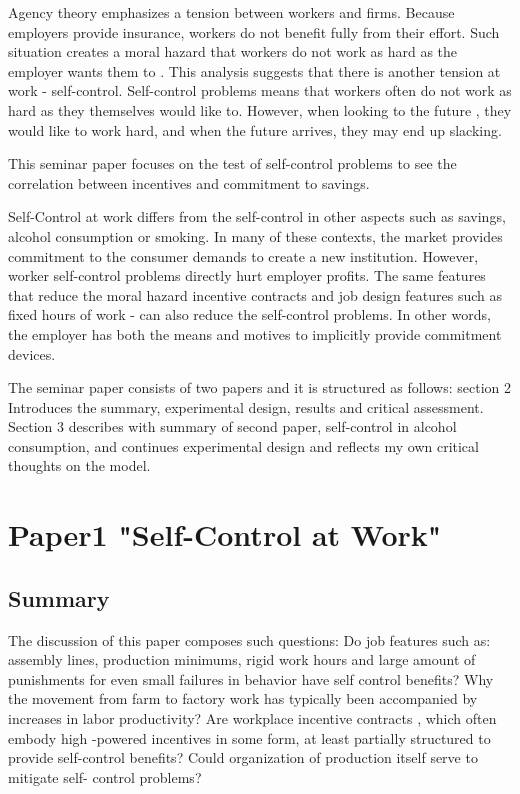 \documentclass[a4paper,12pt]{article}
\begin{document}
Agency theory emphasizes a tension between workers and firms. Because employers provide insurance, workers do not benefit fully from their effort. Such situation creates a moral hazard that workers do not work as hard as the employer wants them to \cite{Holm79}. This analysis suggests that there is another tension at work -  self-control. Self-control problems means that workers often do not work as hard as they themselves would like to. However, when looking to the future , they would like to work hard, and when the future arrives, they may end up slacking. 

This seminar paper focuses on the test of self-control problems to see the correlation between incentives and commitment to savings. 

Self-Control at work differs from the self-control in other aspects such as savings, alcohol consumption or smoking. In many of these contexts, the market provides commitment to the consumer demands to create a new institution. However, worker self-control problems directly hurt employer profits. The same features that reduce the moral hazard incentive contracts and job design features such as fixed hours of work -  can also reduce the self-control problems. In other words, the employer has both the means and motives to implicitly provide commitment devices. 

The  seminar  paper consists of two papers and it is  structured  as  follows: section 2 Introduces the summary, experimental design, results and critical assessment. Section 3 describes with summary of second paper, self-control in alcohol consumption, and continues experimental design and reflects my  own critical thoughts on the model.  


\section{Paper1 "Self-Control at Work"}


\subsection{Summary}

The discussion of this paper composes such questions: Do job features such as:  assembly lines, production minimums, rigid work hours and large amount of punishments for even small failures in behavior have self control benefits? Why the movement from farm to factory work has typically been accompanied by increases in labor productivity? Are workplace incentive contracts , which often embody high -powered incentives in some form, at least partially structured to provide self-control benefits? Could organization of production itself serve to mitigate self- control problems? 
\end{document}
